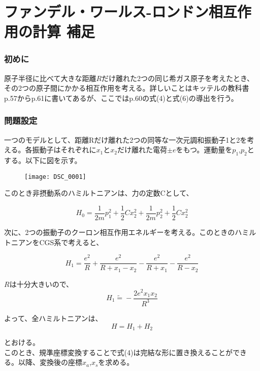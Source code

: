 \documentclass{jsarticle}
\begin{document}
\part{ファンデル・ワールス-ロンドン相互作用の計算 補足}
	\section{初めに}
	原子半径に比べて大きな距離$R$だけ離れた2つの同じ希ガス原子を考えたとき、その2つの原子間にかかる相互作用を考える。詳しいことはキッテルの教科書p.57からp.61に書いてあるが、ここではp.60の式(4)と式(6)の導出を行う。

	\section{問題設定}
	一つのモデルとして、距離Rだけ離れた2つの同等な一次元調和振動子1と2を考える。各振動子はそれぞれに$x_{1}$と$x_{2}$だけ離れた電荷$\pm e$をもつ。運動量を$p_{1}$,$p_2$とする。以下に図を示す。\\
	\begin{figure}[H]
		\centering
		\texttt{[image: DSC\_0001]}
		\caption{}
		\label{fig:dsc0001}
	\end{figure}

	このとき非摂動系のハミルトニアンは、力の定数Cとして、

		\begin{equation}
			H_{0}=\frac{1}{2m}p_{1}^{2}+\frac{1}{2}Cx_{2}^{2}+\frac{1}{2m}p_{2}^{2}+\frac{1}{2}Cx_{2}^{2}
		\end{equation}

	次に、2つの振動子のクーロン相互作用エネルギーを考える。このときのハミルトニアンをCGS系で考えると、

		\begin{equation}
			H_{1}=\frac{e^{2}}{R}+\frac{e^{2}}{R+x_{1}-x_{2}}-\frac{e^{2}}{R+x_{1}}-\frac{e^{2}}{R-x_{2}}
		\end{equation}

	$R$は十分大きいので、
		\begin{equation}
			H_{1}\tilde{=}-\frac{2e^{2}x_{1}x_{2}}{R^{3}}
		\end{equation}

	よって、全ハミルトニアンは、
		\begin{equation}
			H=H_{1}+H_{2}
		\end{equation}

	とおける。\\
	このとき、規準座標変換することで式(4)は完結な形に置き換えることができる。以降、変換後の座標$x_a$,$x_s$を求める。
\end{document}
